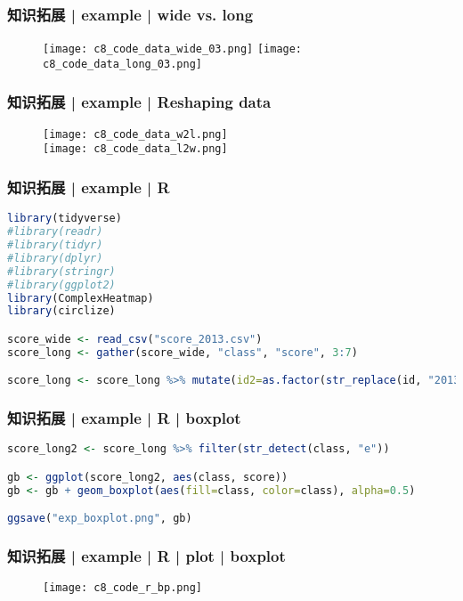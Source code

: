\begin{frame}
  \frametitle{知识拓展 | example | wide vs. long}
  \begin{figure}
    \centering
    \texttt{[image: c8\_code\_data\_wide\_03.png]}\qquad
    \texttt{[image: c8\_code\_data\_long\_03.png]}
  \end{figure}
\end{frame}

\begin{frame}
  \frametitle{知识拓展 | example | Reshaping data}
  \begin{figure}
    \centering
    \texttt{[image: c8\_code\_data\_w2l.png]}\\
    \vspace{0.5em}
    \texttt{[image: c8\_code\_data\_l2w.png]}
  \end{figure}
\end{frame}

\begin{frame}[fragile]
  \frametitle{知识拓展 | example | R}
\begin{lstlisting}[language=r]
library(tidyverse)
#library(readr)
#library(tidyr)
#library(dplyr)
#library(stringr)
#library(ggplot2)
library(ComplexHeatmap)
library(circlize)

score_wide <- read_csv("score_2013.csv")
score_long <- gather(score_wide, "class", "score", 3:7)

score_long <- score_long %>% mutate(id2=as.factor(str_replace(id, "20130521", "")))
\end{lstlisting}
\end{frame}

\begin{frame}[fragile]
  \frametitle{知识拓展 | example | R | boxplot}
\begin{lstlisting}[language=r]
score_long2 <- score_long %>% filter(str_detect(class, "e"))

gb <- ggplot(score_long2, aes(class, score))
gb <- gb + geom_boxplot(aes(fill=class, color=class), alpha=0.5)

ggsave("exp_boxplot.png", gb)
\end{lstlisting}
\end{frame}

\begin{frame}
  \frametitle{知识拓展 | example | R | plot | boxplot}
  \begin{figure}
    \centering
    \texttt{[image: c8\_code\_r\_bp.png]}
  \end{figure}
\end{frame}

